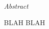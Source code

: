 \vfill
\begin{center}
{\it \large Abstract}
\vspace{0.2cm}

\begin{minipage}{0.8\textwidth}{
BLAH BLAH
}
\end{minipage}
\end{center}
\vfill
\vspace{1cm}
